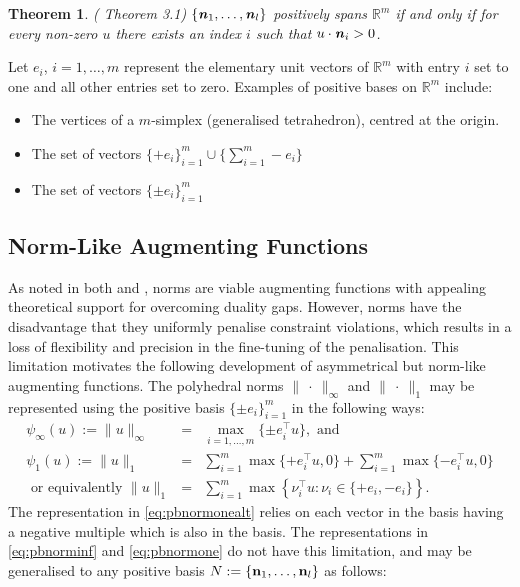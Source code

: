 \documentclass[preprint, 1p, review]{elsarticle}
\newtheorem{theorem}{Theorem}
\newcommand{\bfemph}[1]{\textbf{\emph{#1}}}
\begin{document}
\begin{theorem}\label{theorem:positive-dot-product} (\cite{Davis1954} Theorem 3.1) $\left\{\bfemph{n}_{1},\dots , \bfemph{n}_{l}\right\}$ positively spans $\mathbb{R}^{m}$ if and only if for every non-zero $u$ there exists an index $i$ such that $u\cdot \bfemph{n}_{i} > 0$.
\end{theorem}

Let $e_i$, $i=1,\dots,m$ represent the elementary unit vectors of $\mathbb{R}^{m}$ with entry $i$ set to one and all other entries set to zero. Examples of positive bases on $\mathbb{R}^{m}$ include:
\begin{itemize}
	\item The vertices of a ${m}$-simplex (generalised tetrahedron), centred at the origin.
	\item The set of vectors $\{+e_i\}^{m}_{i=1} \cup \{ \sum_{i=1}^{m} - e_i\}$
	\item The set of vectors $\{\pm e_i\}^{m}_{i=1}$
\end{itemize}

\subsection{Norm-Like Augmenting Functions}

As noted in both \cite{BolandEberhardetal2015} and \cite{Feizollahi2016}, norms are viable augmenting functions with appealing theoretical support for overcoming duality gaps. However, norms have the disadvantage that they uniformly penalise constraint violations, which 
results in a loss of flexibility and precision in the fine-tuning of the penalisation.
This limitation motivates the following development of asymmetrical but norm-like augmenting functions. The polyhedral norms $\| \ {\cdot} \ \|_\infty$ and $ \| \ {\cdot} \ \|_1$ may be represented using the positive basis $\{\pm e_i\}^{m}_{i=1}$ in the following ways:
%
\begin{eqnarray}
\psi_\infty(u) := \|{u}\|_\infty &=& \max_{i=1,\dots,{m}} \{ \pm e_i^\top u\}, \text{ and} \label{eq:pbnorminf} \\ 
\psi_1(u) := \| u \|_1 &=& \sum_{i=1}^{m}  \max \{ +e_i^\top u, 0 \} + \sum_{i=1}^{m} \max \{ - e_i^\top u, 0 \}  \label{eq:pbnormone} \\ 
\text{ or equivalently } \| u\|_1 &=&  \sum_{i=1}^{m} \max \left\{ \nu_i^\top u : \nu_i \in \{+e_i, -e_i \} \right\}. \label{eq:pbnormonealt}
\end{eqnarray}
The representation in \eqref{eq:pbnormonealt} relies on each vector in the basis having a negative multiple which is also in the basis. The representations in \eqref{eq:pbnorminf} and \eqref{eq:pbnormone} do not have this limitation, and may be generalised to any positive basis $N := \{\text{\bf n}_1, \dots, \text{\bf n}_l \}$ as follows:
\end{document}

